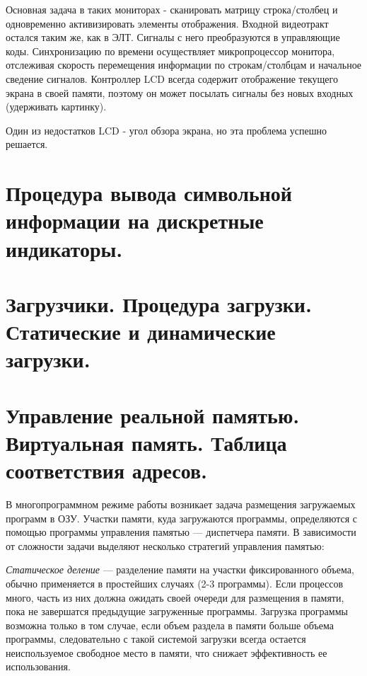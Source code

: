 \documentclass[unicode, 12pt, a4paper, oneside]{article}
\begin{document}
Основная задача в таких мониторах - сканировать матрицу строка/столбец и одновременно активизировать элементы отображения. Входной видеотракт остался таким же, как в ЭЛТ. Сигналы с него преобразуются в управляющие коды. Синхронизацию по времени осуществляет микропроцессор монитора, отслеживая скорость перемещения информации по строкам/столбцам и начальное сведение сигналов. Контроллер LCD всегда содержит отображение текущего экрана в своей памяти, поэтому он может посылать сигналы без новых входных (удерживать картинку).

Один из недостатков LCD - угол обзора экрана, но эта проблема успешно решается.

\section{Процедура вывода символьной информации на дискретные индикаторы.}

\section{Загрузчики. Процедура загрузки. Статические и динамические загрузки.}

\section{Управление реальной памятью. Виртуальная память. Таблица соответствия адресов.}

В многопрограммном режиме работы возникает задача размещения загружаемых программ в ОЗУ.  Участки памяти, куда загружаются программы, определяются с помощью программы управления памятью — диспетчера памяти. В зависимости от сложности задачи выделяют несколько стратегий управления памятью:

\textit{Статическое деление} --- разделение памяти на участки фиксированного объема, обычно применяется в простейших случаях (2-3 программы). Если процессов много, часть из них должна ожидать своей очереди для размещения в памяти, пока не завершатся предыдущие загруженные программы. Загрузка программы возможна только в том случае, если объем раздела в памяти больше объема программы, следовательно с такой системой загрузки всегда остается неиспользуемое свободное место в памяти, что снижает эффективность ее использования.
\end{document}
